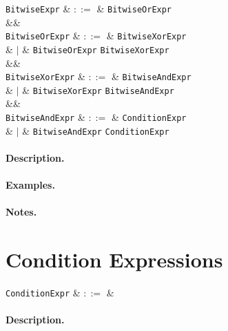 \begin{syntax}
  \verb+BitwiseExpr+ & $::=$ & \verb+BitwiseOrExpr+ \\
  &&\\
  \verb+BitwiseOrExpr+ & $::=$ & \verb+BitwiseXorExpr+ \\
                           & $|$ & \verb+BitwiseOrExpr+ \token{|} \verb+BitwiseXorExpr+\\
  &&\\
  \verb+BitwiseXorExpr+ & $::=$ & \verb+BitwiseAndExpr+ \\
                            & $|$ & \verb+BitwiseXorExpr+ \token{\^} \verb+BitwiseAndExpr+\\
  &&\\
  \verb+BitwiseAndExpr+ & $::=$ & \verb+ConditionExpr+ \\
                            & $|$ & \verb+BitwiseAndExpr+ \token{\&\&} \verb+ConditionExpr+\\

\end{syntax}

\paragraph{Description.}

\paragraph{Examples.}

\paragraph{Notes.} 


\section{Condition Expressions}

\begin{syntax}
  \verb+ConditionExpr+ & $::=$ &\\
\end{syntax}

\paragraph{Description.}

